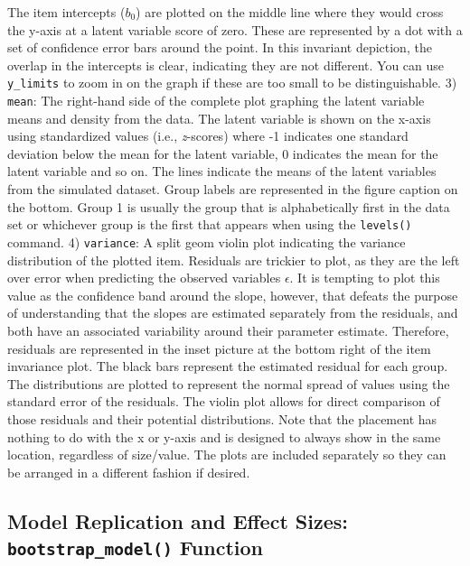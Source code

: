 \documentclass[
  man,floatsintext]{apa7}
\begin{document}
The item intercepts (\(b_0\)) are plotted on the middle line where they would cross the y-axis at a latent variable score of zero. These are represented by a dot with a set of confidence error bars around the point. In this invariant depiction, the overlap in the intercepts is clear, indicating they are not different. You can use \texttt{y\_limits} to zoom in on the graph if these are too small to be distinguishable.
3) \texttt{mean}: The right-hand side of the complete plot graphing the latent variable means and density from the data. The latent variable is shown on the x-axis using standardized values (i.e., \emph{z}-scores) where -1 indicates one standard deviation below the mean for the latent variable, 0 indicates the mean for the latent variable and so on. The lines indicate the means of the latent variables from the simulated dataset. Group labels are represented in the figure caption on the bottom. Group 1 is usually the group that is alphabetically first in the data set or whichever group is the first that appears when using the \texttt{levels()} command.
4) \texttt{variance}: A split geom violin plot indicating the variance distribution of the plotted item. Residuals are trickier to plot, as they are the left over error when predicting the observed variables \(\epsilon\). It is tempting to plot this value as the confidence band around the slope, however, that defeats the purpose of understanding that the slopes are estimated separately from the residuals, and both have an associated variability around their parameter estimate. Therefore, residuals are represented in the inset picture at the bottom right of the item invariance plot. The black bars represent the estimated residual for each group. The distributions are plotted to represent the normal spread of values using the standard error of the residuals. The violin plot allows for direct comparison of those residuals and their potential distributions. Note that the placement has nothing to do with the x or y-axis and is designed to always show in the same location, regardless of size/value. The plots are included separately so they can be arranged in a different fashion if desired.

\subsection{\texorpdfstring{Model Replication and Effect Sizes: \texttt{bootstrap\_model()} Function}{Model Replication and Effect Sizes: bootstrap\_model() Function}}\label{model-replication-and-effect-sizes-bootstrap_model-function}
\end{document}
